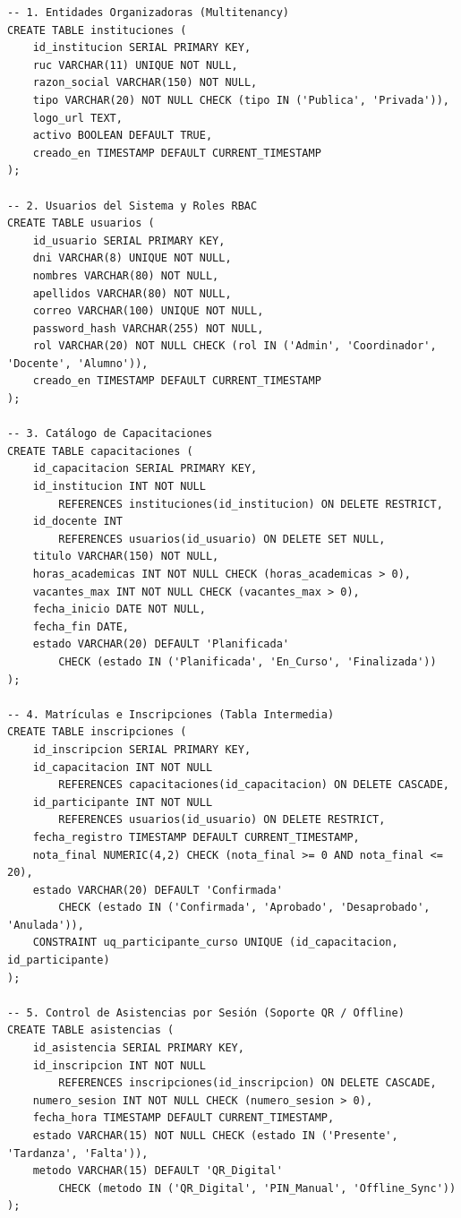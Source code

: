 \documentclass[11pt,a4paper]{article}
\begin{document}
\begin{tcolorbox}[breakable, colback=CodeBg, colframe=black!40, title=\textbf{Script DDL PostgreSQL 16 -- SIGC-CUSCO}, arc=1mm]
\scriptsize
\begin{verbatim}
-- 1. Entidades Organizadoras (Multitenancy)
CREATE TABLE instituciones (
    id_institucion SERIAL PRIMARY KEY,
    ruc VARCHAR(11) UNIQUE NOT NULL,
    razon_social VARCHAR(150) NOT NULL,
    tipo VARCHAR(20) NOT NULL CHECK (tipo IN ('Publica', 'Privada')),
    logo_url TEXT,
    activo BOOLEAN DEFAULT TRUE,
    creado_en TIMESTAMP DEFAULT CURRENT_TIMESTAMP
);

-- 2. Usuarios del Sistema y Roles RBAC
CREATE TABLE usuarios (
    id_usuario SERIAL PRIMARY KEY,
    dni VARCHAR(8) UNIQUE NOT NULL,
    nombres VARCHAR(80) NOT NULL,
    apellidos VARCHAR(80) NOT NULL,
    correo VARCHAR(100) UNIQUE NOT NULL,
    password_hash VARCHAR(255) NOT NULL,
    rol VARCHAR(20) NOT NULL CHECK (rol IN ('Admin', 'Coordinador', 'Docente', 'Alumno')),
    creado_en TIMESTAMP DEFAULT CURRENT_TIMESTAMP
);

-- 3. Catálogo de Capacitaciones
CREATE TABLE capacitaciones (
    id_capacitacion SERIAL PRIMARY KEY,
    id_institucion INT NOT NULL 
        REFERENCES instituciones(id_institucion) ON DELETE RESTRICT,
    id_docente INT 
        REFERENCES usuarios(id_usuario) ON DELETE SET NULL,
    titulo VARCHAR(150) NOT NULL,
    horas_academicas INT NOT NULL CHECK (horas_academicas > 0),
    vacantes_max INT NOT NULL CHECK (vacantes_max > 0),
    fecha_inicio DATE NOT NULL,
    fecha_fin DATE,
    estado VARCHAR(20) DEFAULT 'Planificada' 
        CHECK (estado IN ('Planificada', 'En_Curso', 'Finalizada'))
);

-- 4. Matrículas e Inscripciones (Tabla Intermedia)
CREATE TABLE inscripciones (
    id_inscripcion SERIAL PRIMARY KEY,
    id_capacitacion INT NOT NULL 
        REFERENCES capacitaciones(id_capacitacion) ON DELETE CASCADE,
    id_participante INT NOT NULL 
        REFERENCES usuarios(id_usuario) ON DELETE RESTRICT,
    fecha_registro TIMESTAMP DEFAULT CURRENT_TIMESTAMP,
    nota_final NUMERIC(4,2) CHECK (nota_final >= 0 AND nota_final <= 20),
    estado VARCHAR(20) DEFAULT 'Confirmada' 
        CHECK (estado IN ('Confirmada', 'Aprobado', 'Desaprobado', 'Anulada')),
    CONSTRAINT uq_participante_curso UNIQUE (id_capacitacion, id_participante)
);

-- 5. Control de Asistencias por Sesión (Soporte QR / Offline)
CREATE TABLE asistencias (
    id_asistencia SERIAL PRIMARY KEY,
    id_inscripcion INT NOT NULL 
        REFERENCES inscripciones(id_inscripcion) ON DELETE CASCADE,
    numero_sesion INT NOT NULL CHECK (numero_sesion > 0),
    fecha_hora TIMESTAMP DEFAULT CURRENT_TIMESTAMP,
    estado VARCHAR(15) NOT NULL CHECK (estado IN ('Presente', 'Tardanza', 'Falta')),
    metodo VARCHAR(15) DEFAULT 'QR_Digital' 
        CHECK (metodo IN ('QR_Digital', 'PIN_Manual', 'Offline_Sync'))
);


\end{verbatim}
\end{tcolorbox}
\end{document}
